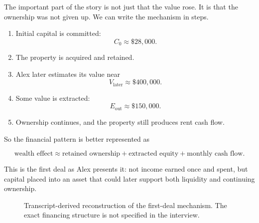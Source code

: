 The important part of the story is not just that the value rose. It is that the ownership was not given up. We can write the mechanism in steps.

\begin{enumerate}
\item Initial capital is committed:
\[
C_0 \approx \$28{,}000.
\]

\item The property is acquired and retained.

\item Alex later estimates its value near
\[
V_{\text{later}} \approx \$400{,}000.
\]

\item Some value is extracted:
\[
E_{\text{out}} \approx \$150{,}000.
\]

\item Ownership continues, and the property still produces rent cash flow.
\end{enumerate}

So the financial pattern is better represented as

\begin{equation}
\text{wealth effect}
\approx
\text{retained ownership}
+
\text{extracted equity}
+
\text{monthly cash flow}.
\end{equation}

This is the first deal as Alex presents it: not income earned once and spent, but capital placed into an asset that could later support both liquidity and continuing ownership.

\begin{figure}
\centering
{}
\caption{Transcript-derived reconstruction of the first-deal mechanism. The exact financing structure is not specified in the interview.}
\end{figure}

